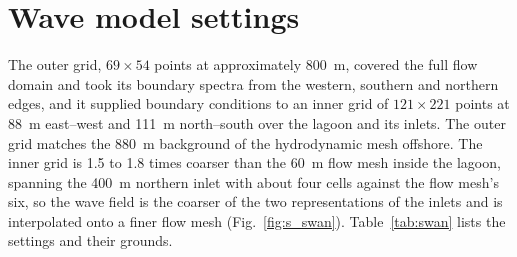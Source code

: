 \documentclass[12pt]{article}
\begin{document}
\section{Wave model settings}
\label{sec:s_waves}

The outer grid, $69 \times 54$ points at approximately 800~m, covered the full
flow domain and took its boundary spectra from the western, southern and
northern edges, and it supplied boundary conditions to an inner grid of
$121 \times 221$ points at 88~m east--west and 111~m north--south over the
lagoon and its inlets. The outer grid matches the 880~m background of the
hydrodynamic mesh offshore. The inner grid is 1.5 to 1.8 times coarser than the
60~m flow mesh inside the lagoon, spanning the 400~m northern inlet with about
four cells against the flow mesh's six, so the wave field is the coarser of
the two representations of the inlets and is interpolated onto a finer flow
mesh (Fig.~\ref{fig:s_swan}). Table~\ref{tab:swan} lists the
settings and their grounds.
\end{document}
